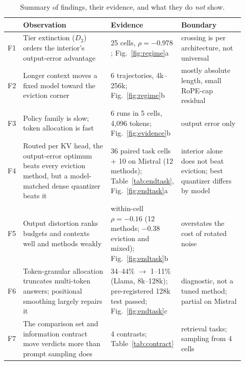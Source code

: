 \documentclass{article}
\theoremstyle{definition}
\begin{document}
\begin{table}[t]
\centering
\small
\setlength{\tabcolsep}{4pt}
\caption{Summary of findings, their evidence, and what they do \emph{not} show.}
\label{tab:findings}
\begin{tabular}{@{}p{0.03\linewidth}p{0.40\linewidth}p{0.20\linewidth}p{0.29\linewidth}@{}}
\toprule
& \textbf{Observation} & \textbf{Evidence} & \textbf{Boundary} \\
\midrule
F1 & Tier extinction ($D_2$) orders the interior's output-error advantage & 25 cells, $\rho=-0.978$; Fig.~\ref{fig:regime}a & crossing is per architecture, not universal \\
F2 & Longer context moves a fixed model toward the eviction corner & 6 trajectories, 4k--256k; Fig.~\ref{fig:regime}b & mostly absolute length, small RoPE-cap residual \\
F3 & Policy family is slow; token allocation is fast & 6 runs in 5 cells, 4,096 tokens; Fig.~\ref{fig:evidence}b & output error only \\
F4 & Routed per KV head, the output-error optimum beats every eviction method, but a model-matched dense quantizer beats it & 36 paired task cells + 10 on Mistral (12 methods); Table~\ref{tab:endtask}, Fig.~\ref{fig:endtask}a & interior alone does not beat eviction; best quantizer differs by model \\
F5 & Output distortion ranks budgets and contexts well and methods weakly & within-cell $\rho=-0.16$ (12 methods; $-0.38$ eviction and mixed); Fig.~\ref{fig:endtask}b & overstates the cost of rotated noise \\
F6 & Token-granular allocation truncates multi-token answers; positional smoothing largely repairs it & 34--44\% $\to$ 1--11\% (Llama, 8k--128k); pre-registered 128k test passed; Fig.~\ref{fig:endtask}c & diagnostic, not a tuned method; partial on Mistral \\
F7 & The comparison set and information contract move verdicts more than prompt sampling does & 4 contrasts; Table~\ref{tab:contract} & retrieval tasks; sampling from 4 cells \\ %
\bottomrule
\end{tabular}
\vspace{-2mm}
\end{table}
\end{document}
